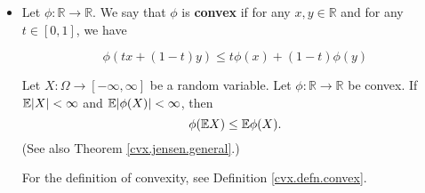 \begin{itemize}
\begin{itemize}
\begin{proof}
\[
\E\big[ (aX -bY)^2 \big] = 0
\]

which is true if and only if \(\Pr(aX = bY) = 1\) by by Lemma \ref{asym.cauchy.lemma} and Proposition \ref{prob.const.var}.
\end{proof}


\item \begin{definition}Let \(\phi: \mathbb{R} \to \mathbb{R}\). We say that \(\phi\) is \textbf{convex} if for any \(x, y \in \mathbb{R}\) and for any \(t \in [0,1]\), we have

\[
\phi(tx + (1-t)y) \leq t \phi(x) + (1-t) \phi(y)
\]
 \end{definition}
 
% 
% 
% 

%

\begin{theorem}\label{asym.jensen.general}Let $X:\Omega\to[-\infty,\infty]$ be a random variable.  Let $\phi:\mathbb{R}\to\mathbb{R}$ be convex. If $\mathbb{E}|X|<\infty$ and $\mathbb{E}|\phi(X)|<\infty$, then
$$\phi(\mathbb{E} X)\leq \mathbb{E} \phi(X).$$ (See also Theorem \ref{cvx.jensen.general}.)
\end{theorem}

For the definition of convexity, see Definition \ref{cvx.defn.convex}.


\end{itemize}
\end{itemize}
